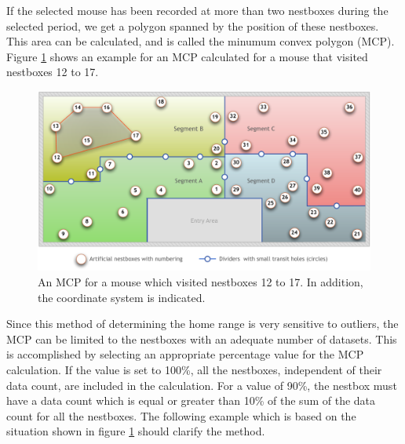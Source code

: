 If the selected mouse has been recorded at more than two nestboxes during the selected period, we get a polygon spanned by the position of these nestboxes. This area can be calculated, and is called the minumum convex polygon (MCP). Figure \ref{fig:mcp} shows an example for an MCP calculated for a mouse that visited nestboxes 12 to 17. 

\begin{figure}[htpb]
\begin{center}
  \includegraphics[width=.75\textwidth]{assets/pdf/mcp.pdf}
  \caption[Minimum convex polygon (MCP)]{An MCP for a mouse which visited nestboxes 12 to 17. In addition, the coordinate system is indicated.}
  \label{fig:mcp}
\end{center}
\end{figure}

Since this method of determining the home range is very sensitive to outliers, the MCP can be limited to the nestboxes with an adequate number of datasets. This is accomplished by selecting an appropriate percentage value for the MCP calculation. If the value is set to 100\%, all the nestboxes, independent of their data count, are included in the calculation. For a value of 90\%, the nestbox must have a data count which is equal or greater than 10\% of the sum of the data count for all the nestboxes. The following example which is based on the situation shown in figure \ref{fig:mcp} should clarify the method.

